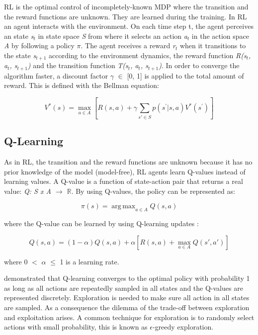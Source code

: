 \documentclass{llncs}
\DeclareMathOperator*{\argmax}{arg\,max}
\begin{document}
RL is the optimal control of incompletely-known MDP where the transition and the reward functions are unknown. They are learned during the training. In RL an agent interacts with the environment. On each time step t, the agent perceives an state \textit{s$_{t}$} in state space \textit{S} from where it selects an action \textit{a$_{t}$} in the action space \textit{A} by following a policy \textit{$\pi$}. The agent receives a reward \textit{r$_{t}$} when it transitions to the state \textit{s$_{t+1}$} according to the environment dynamics, the reward function  \textit{R(s$_{t}$, a$_{t}$, s$_{t+1}$)} and the transition function \textit{T(s$_{t}$, a$_{t}$, s$_{t+1}$)}. In order to converge the algorithm faster, a discount factor $\gamma$ $\in$ [0, 1] is applied to the total amount of reward. This is defined with the Bellman equation:

\begin{equation}
V^{*}(s) = \max_{a \in A} \left[ R(s, a) + \gamma \displaystyle\sum_{s' \in S} p(s^{'}|s,a) V^{*}(s^{'}) \right]
\end{equation}

\subsection{Q-Learning}

	As in RL, the transition and the reward functions are unknown because it has no prior knowledge of the model (model-free), RL agents learn Q-values instead of learning values. A Q-value is a function of state-action pair that returns a real value: \textit{Q: S x A $\rightarrow$ $\mathbb{R}$}. By using Q-values, the policy can be represented as:

\begin{equation}
\pi(s) = \argmax_{a \in A} Q(s, a)
\end{equation}

where the Q-value can be learned by using Q-learning updates \cite{Watkins1992}:

\begin{equation}
Q(s, a) = (1 - \alpha)Q(s, a) + \alpha[R(s, a) + \max_{a \in A}Q(s', a')]
\end{equation}

where 0 $<$ $\alpha$ $\leq$ 1 is a learning rate.

	\cite{Watkins1992} demonstrated that Q-learning converges to the optimal policy with probability 1 as long as all actions are repeatedly sampled in all states and the Q-values are represented discretely. Exploration is needed to make sure all action in all states are sampled. As a consequence the dilemma of the trade-off between exploration and exploitation arises. A common technique for exploration is to randomly select actions with small probability, this is known as $\epsilon$-greedy exploration.
\end{document}
